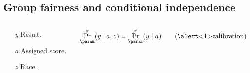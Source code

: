 \subsection{Group fairness and conditional independence}
\begin{frame}
  \begin{columns}
    \begin{column}{0.3\textwidth}
      \begin{itemize}
      \item[$y$] Result.
      \item[$a$] Assigned score.
      \item[$z$] Race.
      \end{itemize}
    \end{column}
    \begin{column}{0.7\textwidth}
      \begin{align}
        \Pr_\param^\pi(y \mid a, z) &= \Pr_\param^\pi(y \mid a) \tag{\alert<1>{calibration}}\\

\end{align}
\end{column}
\end{columns}
\end{frame}
